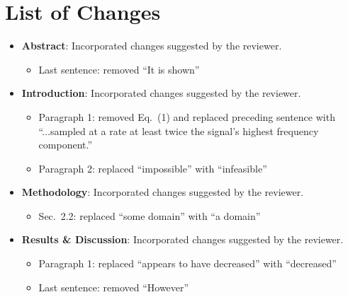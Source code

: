 \documentclass[a4paper,12pt]{article}
\begin{document}
\section*{List of Changes}

\begin{itemize}
	\item \textbf{Abstract}: Incorporated changes suggested by the reviewer.
		\begin{itemize}
			\item Last sentence: removed ``It is shown''
		\end{itemize}
	
	\item \textbf{Introduction}: Incorporated changes suggested by the reviewer.
		\begin{itemize}
			\item Paragraph 1: removed Eq.~(1) and replaced preceding sentence with ``...sampled at a rate at least twice the signal's highest frequency component.''
			\item Paragraph 2: replaced ``impossible'' with ``infeasible''
		\end{itemize}
	\item \textbf{Methodology}: Incorporated changes suggested by the reviewer.
		\begin{itemize}
			\item Sec.~2.2: replaced ``some domain'' with ``a domain''
		\end{itemize}
	\item \textbf{Results \& Discussion}: Incorporated changes suggested by the reviewer.
		\begin{itemize}
			\item Paragraph 1: replaced ``appears to have decreased'' with ``decreased''
			\item Last sentence: removed ``However''
		\end{itemize}
\end{itemize}
\end{document}
